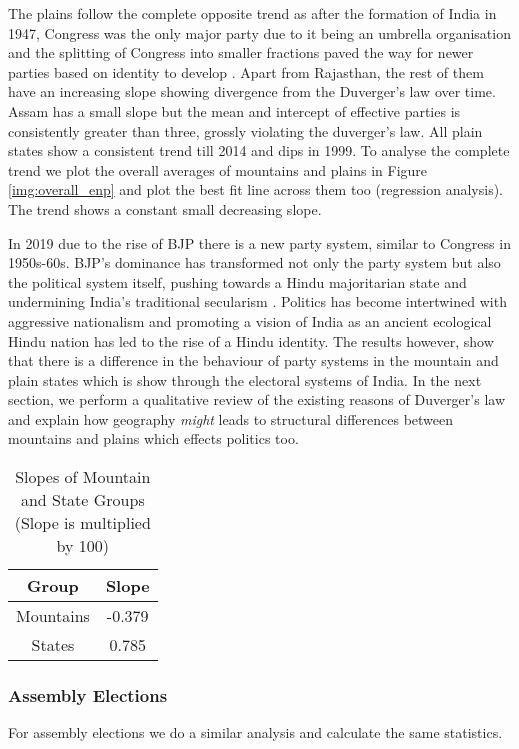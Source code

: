 \vspace{0.3cm}

The plains follow the complete opposite trend as after the formation of India in 1947, Congress was the only major party due to it being an umbrella organisation and the splitting of Congress into smaller fractions paved the way for newer parties based on identity to develop \citep{kothari1967india}. Apart from Rajasthan, the rest of them have an increasing slope showing divergence from the Duverger’s law over time. Assam has a small slope but the mean and intercept of effective parties is consistently greater than three, grossly violating the duverger’s law. All plain states show a consistent trend till 2014 and dips in 1999. To analyse the complete trend we plot the overall averages of mountains and plains in Figure \ref{img:overall_enp} and plot the best fit line across them too (regression analysis). The trend shows a constant small decreasing slope.

\vspace{0.3cm}
In 2019 due to the rise of BJP there is a new party system, similar to Congress in 1950s-60s. BJP's dominance has transformed not only the party system but also the political system itself, pushing towards a Hindu majoritarian state and undermining India's traditional secularism \citep{jaffrelot2020bjp}.  Politics has become intertwined with aggressive nationalism and promoting a vision of India as an ancient ecological Hindu nation has led to the rise of a Hindu identity. The results however, show that there is a difference in the behaviour of party systems in the mountain and plain states which is show through the electoral systems of India. In the next section, we perform a qualitative review of the existing reasons of Duverger's law and explain how geography \textit{might} leads to structural differences between mountains and plains which effects politics too.


\begin{table}[h]
\centering
\begin{tabular}{|c|c|}
\hline
Group & Slope \\
\hline
Mountains & -0.379 \\
\hline
States & 0.785 \\
\hline
\end{tabular}
\caption{Slopes of Mountain and State Groups (Slope is multiplied by 100)}

\end{table}


\subsubsection{Assembly Elections}
For assembly elections we do a similar analysis and calculate the same statistics.
